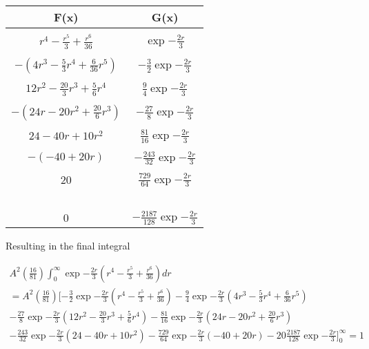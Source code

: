 \documentclass{article}
\begin{document}
    \begin{table}[h]
        \centering
        \begin{tabular}{cc}
        \hline
        \multicolumn{1}{|c|}{F(x)} & \multicolumn{1}{c|}{G(x)} \\ \hline
                 &  \\ 
         $r^4 - \frac{r^5}{3}+\frac{r^6}{36}$   & $\exp{-\frac{2r}{3}}$ \\
         &  \\
         $-(4r^3 - \frac{5}{3}r^4 + \frac{6}{36}r^5)$  & $-\frac{3}{2}\exp{-\frac{2r}{3}}$ \\
         &  \\
         $12r^2 - \frac{20}{3}r^3 + \frac{5}{6}r^4$ & $\frac{9}{4}\exp{-\frac{2r}{3}}$ \\
         &  \\
         $-(24r - 20r^2 + \frac{20}{6}r^3)$ & $-\frac{27}{8}\exp{-\frac{2r}{3}}$ \\
         &  \\
         $24 - 40r + 10r^2$    & $\frac{81}{16}\exp{-\frac{2r}{3}}$ \\
         &  \\
         $-(-40 + 20r)$     & $-\frac{243}{32}\exp{-\frac{2r}{3}}$ \\
         &  \\
         $20$       & $\frac{729}{64}\exp{-\frac{2r}{3}}$ \\\
         &  \\ 
         $0$     & $-\frac{2187}{128}\exp{-\frac{2r}{3}}$    \\       \hline
        \end{tabular}
    \end{table}

    Resulting in the final integral

    \begin{gather*}
        A^2(\frac{16}{81})\int_{0}^{\infty} \exp{-\frac{2r}{3}}(r^4 - \frac{r^5}{3}+\frac{r^6}{36})dr  \\
        = A^2(\frac{16}{81})
        [   
        -\frac{3}{2}\exp{-\frac{2r}{3}}(r^4 - \frac{r^5}{3}+\frac{r^6}{36})
        -\frac{9}{4}\exp{-\frac{2r}{3}}(4r^3 - \frac{5}{3}r^4 + \frac{6}{36}r^5)\\
        -\frac{27}{8}\exp{-\frac{2r}{3}}(12r^2 - \frac{20}{3}r^3 + \frac{5}{6}r^4)
        -\frac{81}{16}\exp{-\frac{2r}{3}}(24r - 20r^2 + \frac{20}{6}r^3)\\
        -\frac{243}{32}\exp{-\frac{2r}{3}}(24 - 40r + 10r^2)
        -\frac{729}{64}\exp{-\frac{2r}{3}}(-40 + 20r)
        -20\frac{2187}{128}\exp{-\frac{2r}{3}}]^{\infty}_{0}=1\\
    \end{gather*}
\end{document}
